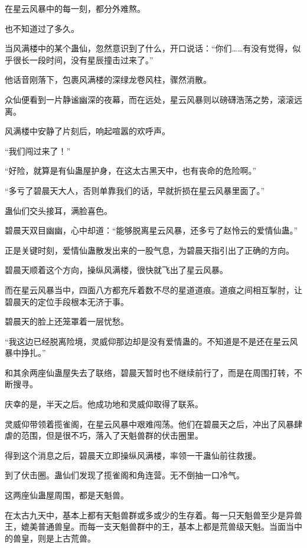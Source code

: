 
\begin{this_body}



在星云风暴中的每一刻，都分外难熬。

也不知道过了多久。

当风满楼中的某个蛊仙，忽然意识到了什么，开口说话：“你们……有没有觉得，似乎很长一段时间，没有星辰撞击过来了。”

他话音刚落下，包裹风满楼的深绿龙卷风柱，骤然消散。

众仙便看到一片静谧幽深的夜幕，而在远处，星云风暴则以磅礴浩荡之势，滚滚远离。

风满楼中安静了片刻后，响起喧嚣的欢呼声。

“我们闯过来了！”

“好险，就算是有仙蛊屋护身，在这太古黑天中，也有丧命的危险啊。”

“多亏了碧晨天大人，否则单靠我们的话，早就折损在星云风暴里面了。”

蛊仙们交头接耳，满脸喜色。

碧晨天双目幽幽，心中却道：“能够脱离星云风暴，还多亏了赵怜云的爱情仙蛊。”

正是关键时刻，爱情仙蛊散发出来的一股气息，为碧晨天指引出了正确的方向。

碧晨天顺着这个方向，操纵风满楼，很快就飞出了星云风暴。

而在星云风暴当中，四面八方都充斥着数不尽的星道道痕。道痕之间相互掣肘，让碧晨天的定位手段根本无济于事。

碧晨天的脸上还笼罩着一层忧愁。

“我这边已经脱离险境，灵威仰那边却是没有爱情蛊的。不知道是不是还在星云风暴中挣扎。”

和其余两座仙蛊屋失去了联络，碧晨天暂时也不继续前行了，而是在周围打转，不断搜寻。

庆幸的是，半天之后。他成功地和灵威仰取得了联系。

灵威仰带领着揽雀阁，在星云风暴中艰难闯荡。他们在碧晨天之后，冲出了风暴肆虐的范围，但是很不巧，落入了天魁兽群的伏击圈里。

得到这个消息之后，碧晨天立即操纵风满楼，率领一干蛊仙前往救援。

到了伏击圈。蛊仙们发现了揽雀阁和角连营。无不倒抽一口冷气。

这两座仙蛊屋周围，都是天魁兽。

在太古九天中，基本上都有天魁兽群或多或少的生存着。每一只天魁兽至少是异兽王，媲美普通兽皇。而每一支天魁兽群中的王，基本上都是荒兽级天魁。当面当中的兽皇，则是上古荒兽。


\end{this_body}
